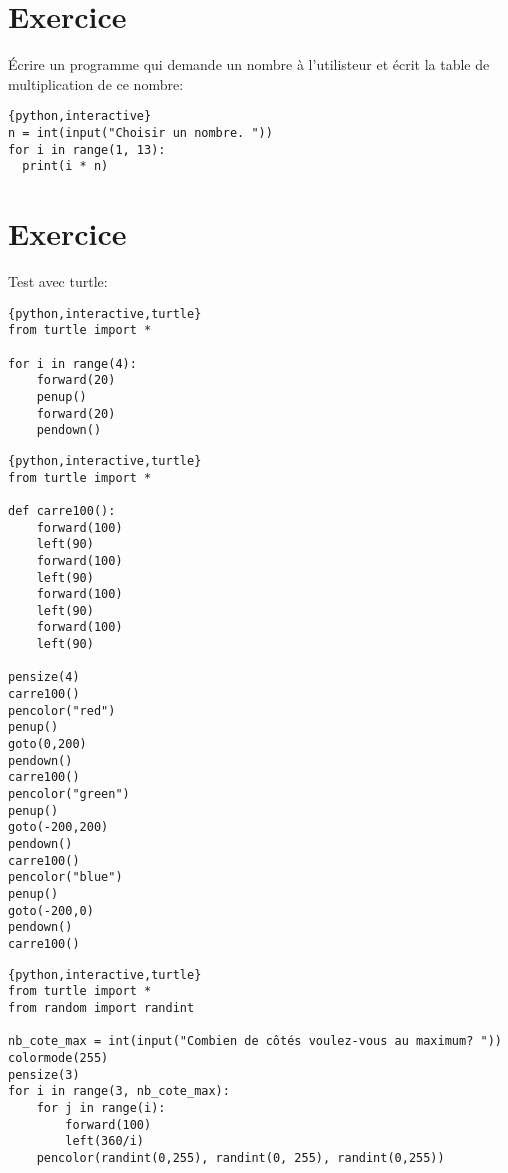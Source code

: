 \documentclass[a4paper,11pt]{article}
\begin{document}
\section{Exercice}
Écrire un programme qui demande un nombre à l'utilisteur et écrit la table de multiplication de ce nombre:\\
\begin{solution}
\begin{verbatim}{python,interactive}
n = int(input("Choisir un nombre. "))
for i in range(1, 13):
  print(i * n)
\end{verbatim}
\end{solution}

\section{Exercice}
Test avec turtle:\\
\begin{solution}
\begin{verbatim}{python,interactive,turtle}
from turtle import *

for i in range(4):
    forward(20)
    penup()
    forward(20)
    pendown()
\end{verbatim}
\end{solution}

\begin{solution}
\begin{verbatim}{python,interactive,turtle}
from turtle import *

def carre100():
    forward(100)
    left(90)
    forward(100)
    left(90)
    forward(100)
    left(90)
    forward(100)
    left(90)

pensize(4)
carre100()
pencolor("red")
penup()
goto(0,200)
pendown()
carre100()
pencolor("green")
penup()
goto(-200,200)
pendown()
carre100()
pencolor("blue")
penup()
goto(-200,0)
pendown()
carre100()
\end{verbatim}
\end{solution}

\begin{solution}
\begin{verbatim}{python,interactive,turtle}
from turtle import *
from random import randint

nb_cote_max = int(input("Combien de côtés voulez-vous au maximum? "))
colormode(255)
pensize(3)
for i in range(3, nb_cote_max):
    for j in range(i):
        forward(100)
        left(360/i)
    pencolor(randint(0,255), randint(0, 255), randint(0,255))
\end{verbatim}
\end{solution}
\end{document}
